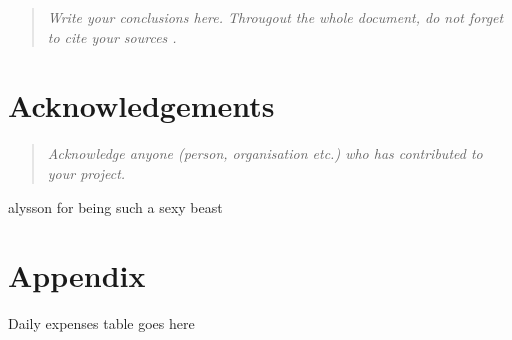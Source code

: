 \documentclass[12pt]{article}
\begin{document}

\begin{quote} \textit{
Write your conclusions here. Througout the whole document, do not forget to cite your sources \cite{example}.
} \end{quote}

\lipsum[3]


\pagebreak

\section{Acknowledgements}
\label{sec:acknow}


\begin{quote} \textit{
Acknowledge anyone (person, organisation etc.) who has contributed to your project.
} \end{quote}

alysson for being such a sexy beast



\pagebreak


\section{Appendix}
\label{sec:appen}

Daily expenses table goes here

\pagebreak
 
\end{document}

